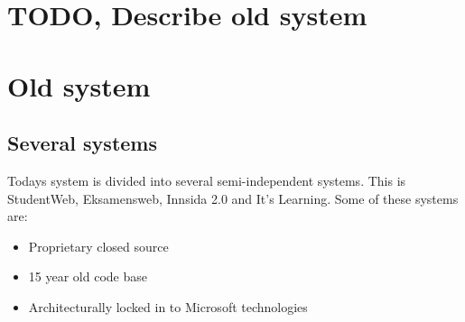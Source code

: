 \section{TODO, Describe old system}
\section{Old system}
\subsection{Several systems}
Todays system is divided into several semi-independent systems. This is StudentWeb, Eksamensweb, Innsida 2.0 and It's Learning. Some of these systems are:
\begin{itemize}
\item Proprietary closed source
\item 15 year old code base
\item Architecturally locked in to Microsoft technologies
\end{itemize}